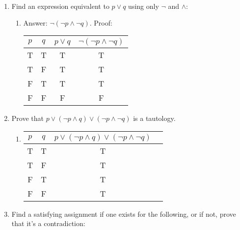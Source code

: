 \documentclass{article}
\begin{document}
\begin{enumerate}
\begin{enumerate}
\begin{tabular}{ |c|c|c|c|c| }
            \end{tabular}
    \end{enumerate}
    \item Find an expression equivalent to $p \lor q$ using only $\lnot$ and $\land$: \\
    \begin{enumerate}
        \item Answer: $\lnot (\lnot p \land \lnot q)$. Proof: \\
            \begin{tabular}{ |c|c|c|c| }
                \hline
                $p$ &   $q$ &   $p \lor q$ &   $\lnot (\lnot p \land \lnot q)$ \\
                \hline
                T   &   T   &   T   &   T   \\                                                                      
                \hline
                T   &   F   &   T   &   T   \\
                \hline
                F   &   T   &   T   &   T   \\
                \hline
                F   &   F   &   F   &   F   \\
                \hline
            \end{tabular}
    \end{enumerate}
    \item Prove that $p \lor (\lnot p \land q) \lor (\lnot p \land \lnot q)$ is a tautology.
        \begin{enumerate}
            \item
                \begin{tabular}{ |c|c|c|c| }
                    \hline
                    $p$ &   $q$ &   $p \lor (\lnot p \land q) \lor (\lnot p \land \lnot q)$ \\
                    \hline
                    T   &   T   &   T   \\
                    \hline
                    T   &   F   &   T   \\
                    \hline
                    F   &   T   &   T   \\
                    \hline
                    F   &   F   &   T   \\
                    \hline
                \end{tabular}
        \end{enumerate}
    \item Find a satisfying assignment if one exists for the following, or if not, prove that it's a contradiction: \\ 

\end{enumerate}
\end{document}
